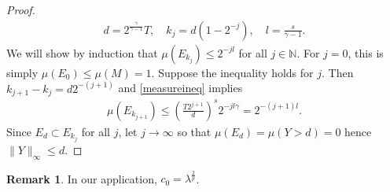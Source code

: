 \documentclass[11pt]{amsart}
\theoremstyle{definition}
\newtheorem{remark}{Remark}[section]
\newtheorem{corollary}{Corollary}[section]
\begin{document}
\begin{proof}
    \begin{align*}
        d=2^{\frac{\gamma}{\gamma-1}}T, \quad k_j=d(1-2^{-j}), \quad l=\frac{s}{\gamma-1}.
    \end{align*}
    We will show by induction that $\mu(E_{k_j})\leq 2^{-jl}$ for all $j\in \mathbb{N}$.  For $j=0$, this is simply $\mu(E_0)\leq \mu(M)=1$.  Suppose the inequality holds for $j$.  Then $k_{j+1}-k_j=d2^{-(j+1)}$ and  \eqref{measureineq} implies
    \begin{align*}
        \mu(E_{k_{j+1}})\leq \left(\frac{T2^{j+1}}{d}\right)^s2^{-jl\gamma}=2^{-(j+1)l}.
    \end{align*}
    Since $E_d\subset E_{k_j}$ for all $j$, let $j\to \infty$ so that $\mu(E_d)=\mu(Y>d)=0$ hence $\|Y\|_\infty\leq d$.
    
\end{proof}

\begin{remark}
    In our application, $c_0=\lambda^{\frac{2}{p}}$.
\end{remark}

\end{document}
